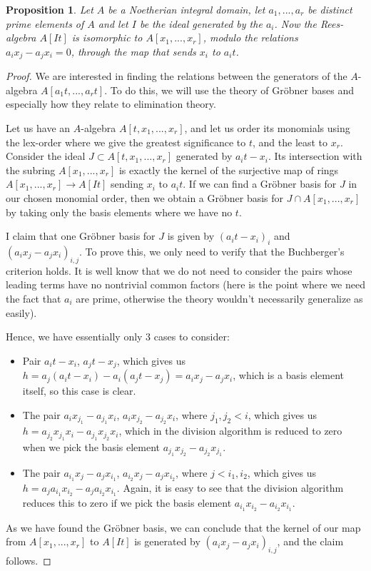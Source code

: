 \documentclass[12pt,a4paper,leqno]{article}
\theoremstyle{plain}
\newtheorem{prop}[theo]{Proposition}
\theoremstyle{definition}
\theoremstyle{remark}
\begin{document}
\begin{prop}\label{StructureOfSmoothBlowUps1}
Let $A$ be a Noetherian integral domain, let $a_1,...,a_r$ be distinct prime elements of $A$ and let $I$ be the ideal generated by the $a_i$. Now the Rees-algebra $A[It]$ is isomorphic to $A[x_1,...,x_r]$, modulo the relations $a_i x_j - a_j x_i = 0$, through the map that sends $x_i$ to $a_i t$. 
\end{prop} 
\begin{proof}
We are interested in finding the relations between the generators of the $A$-algebra $A[a_1 t, ..., a_r t]$. To do this, we will use the theory of Gröbner bases and especially how they relate to elimination theory.

Let us have an $A$-algebra $A[t,x_1,...,x_r]$, and let us order its monomials using the lex-order where we give the greatest significance to $t$, and the least to $x_r$. Consider the ideal $J \subset A[t, x_1,...,x_r]$ generated by $a_i t - x_i$. Its intersection with the subring $A[x_1,...,x_r]$ is exactly the kernel of the surjective map of rings $A[x_1,...,x_r] \to A[It]$ sending $x_i$ to $a_i t$. If we can find a Gröbner basis for $J$ in our chosen monomial order, then we obtain a Gröbner basis for $J \cap A[x_1,...,x_r]$ by taking only the basis elements where we have no $t$.

I claim that one Gröbner basis for $J$ is given by $(a_i t - x_i)_i$ and $(a_i x_j - a_j x_i)_{i,j}$. To prove this, we only need to verify that the Buchberger's criterion holds. It is well know that we do not need to consider the pairs whose leading terms have no nontrivial common factors (here is the point where we need the fact that $a_i$ are prime, otherwise the theory wouldn't necessarily generalize as easily).

Hence, we have essentially only 3 cases to consider:
\begin{itemize}
\item Pair $a_i t - x_i$, $a_j t - x_j$, which gives us $h = a_j(a_i t - x_i) - a_i (a_j t - x_j)  = a_i x_j - a_j x_i$, which is a basis element itself, so this case is clear. 

\item The pair $a_i x_{j_1} - a_{j_1} x_i$, $a_i x_{j_2} - a_{j_2} x_i$, where $j_1,j_2 < i$, which gives us $h = a_{j_2} x_{j_1} x_i - a_{j_1} x_{j_2} x_i$, which in the division algorithm is reduced to zero when we pick the basis element $a_{j_1} x_{j_2} - a_{j_2} x_{j_1}$. 
 
\item The pair $a_{i_1} x_j - a_j x_{i_1}$, $a_{i_2} x_j - a_j x_{i_2}$, where $j < i_1, i_2$, which gives us $h = a_j a_{i_1} x_{i_2} - a_j a_{i_2} x_{i_1}$. Again, it is easy to see that the division algorithm reduces this to zero if we pick the basis element $a_{i_1} x_{i_2} - a_{i_2} x_{i_1}$. 
\end{itemize} 
As we have found the Gröbner basis, we can conclude that the kernel of our map from $A[x_1, ... , x_r]$ to $A[It]$ is generated by $(a_i x_j - a_j x_i)_{i,j}$, and the claim follows.
\end{proof}
\end{document}
